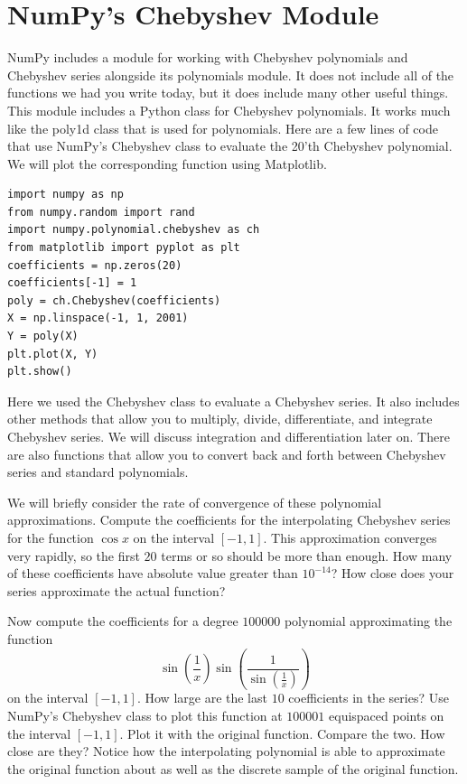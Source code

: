 \section*{NumPy's Chebyshev Module}

NumPy includes a module for working with Chebyshev polynomials and Chebyshev series alongside its polynomials module.
It does not include all of the functions we had you write today, but it does include many other useful things.
This module includes a Python class for Chebyshev polynomials.
It works much like the poly1d class that is used for polynomials.
Here are a few lines of code that use NumPy's Chebyshev class to evaluate the 20'th Chebyshev polynomial.
We will plot the corresponding function using Matplotlib.
\begin{lstlisting}
import numpy as np
from numpy.random import rand
import numpy.polynomial.chebyshev as ch
from matplotlib import pyplot as plt
coefficients = np.zeros(20)
coefficients[-1] = 1
poly = ch.Chebyshev(coefficients)
X = np.linspace(-1, 1, 2001)
Y = poly(X)
plt.plot(X, Y)
plt.show()
\end{lstlisting}

Here we used the Chebyshev class to evaluate a Chebyshev series.
It also includes other methods that allow you to multiply, divide, differentiate, and integrate Chebyshev series.
We will discuss integration and differentiation later on.
There are also functions that allow you to convert back and forth between Chebyshev series and standard polynomials.

\begin{problem}
\label{prob:cheb_interpolations}
We will briefly consider the rate of convergence of these polynomial approximations.
Compute the coefficients for the interpolating Chebyshev series for the function $\cos x$ on the interval $[-1, 1]$.
This approximation converges very rapidly, so the first $20$ terms or so should be more than enough.
How many of these coefficients have absolute value greater than $10^{-14}$?
How close does your series approximate the actual function?

Now compute the coefficients for a degree $100000$ polynomial approximating the function
\[\sin \left( \frac{1}{x} \right) \sin \left( \frac{1}{\sin \left( \frac{1}{x} \right)} \right) \]
on the interval $[-1, 1]$.
How large are the last $10$ coefficients in the series?
Use NumPy's Chebyshev class to plot this function at $100001$ equispaced points on the interval $[-1, 1]$.
Plot it with the original function.
Compare the two.
How close are they?
Notice how the interpolating polynomial is able to approximate the original function about as well as the discrete sample of the original function.
\end{problem}

